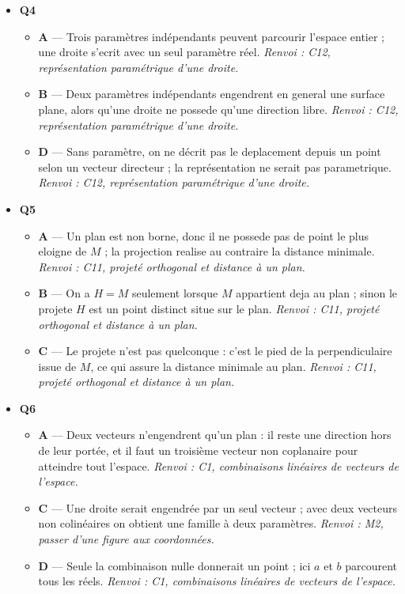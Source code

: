 \begin{itemize}
\begin{itemize}
  \end{itemize}
  \item \textbf{Q4}
  \begin{itemize}
    \item \textbf{A} — Trois paramètres indépendants peuvent parcourir l'espace entier ; une droite s'ecrit avec un seul paramètre réel. \emph{Renvoi : C12, représentation paramétrique d'une droite.}
    \item \textbf{B} — Deux paramètres indépendants engendrent en general une surface plane, alors qu'une droite ne possede qu'une direction libre. \emph{Renvoi : C12, représentation paramétrique d'une droite.}
    \item \textbf{D} — Sans paramètre, on ne décrit pas le deplacement depuis un point selon un vecteur directeur ; la représentation ne serait pas parametrique. \emph{Renvoi : C12, représentation paramétrique d'une droite.}
  \end{itemize}
  \item \textbf{Q5}
  \begin{itemize}
    \item \textbf{A} — Un plan est non borne, donc il ne possede pas de point le plus eloigne de $M$ ; la projection realise au contraire la distance minimale. \emph{Renvoi : C11, projeté orthogonal et distance à un plan.}
    \item \textbf{B} — On a $H=M$ seulement lorsque $M$ appartient deja au plan ; sinon le projete $H$ est un point distinct situe sur le plan. \emph{Renvoi : C11, projeté orthogonal et distance à un plan.}
    \item \textbf{C} — Le projete n'est pas quelconque : c'est le pied de la perpendiculaire issue de $M$, ce qui assure la distance minimale au plan. \emph{Renvoi : C11, projeté orthogonal et distance à un plan.}
  \end{itemize}
  \item \textbf{Q6}
  \begin{itemize}
    \item \textbf{A} — Deux vecteurs n'engendrent qu'un plan : il reste une direction hors de leur portée, et il faut un troisième vecteur non coplanaire pour atteindre tout l'espace. \emph{Renvoi : C1, combinaisons linéaires de vecteurs de l'espace.}
    \item \textbf{C} — Une droite serait engendrée par un seul vecteur ; avec deux vecteurs non colinéaires on obtient une famille à deux paramètres. \emph{Renvoi : M2, passer d'une figure aux coordonnées.}
    \item \textbf{D} — Seule la combinaison nulle donnerait un point ; ici $a$ et $b$ parcourent tous les réels. \emph{Renvoi : C1, combinaisons linéaires de vecteurs de l'espace.}

\end{itemize}
\end{itemize}
